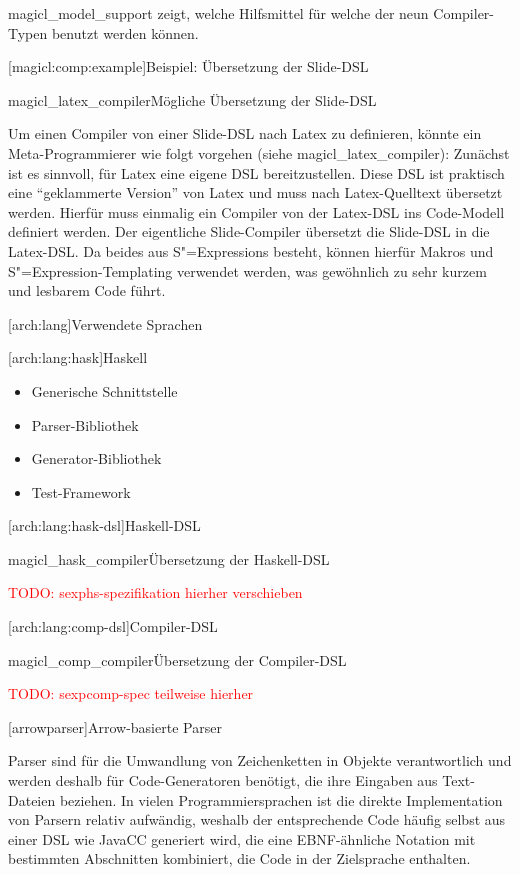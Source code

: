 \documentclass[12pt, a4paper, bibgerm]{scrbook}
\newcommand{\todo}[1]{
  \textcolor{red}{TODO: #1}
}
\newcommand\lchapter{}
\newcommand\lsection{}
\newcommand\lsubsection{}
\newcommand\lsubsubsection{}
\newcommand\abb{}
\newcommand\fig{}
\newcommand{\sexp}{S"=Expression}
\newcommand{\sexps}{S"=Expressions}
\begin{document}
\abb{magicl_model_support} zeigt, welche Hilfsmittel für
welche der neun Compiler-Typen benutzt werden können.

\lsubsubsection[magicl:comp:example]{Beispiel: Übersetzung der Slide-DSL}

\fig{magicl_latex_compiler}{Mögliche Übersetzung der Slide-DSL}

Um einen Compiler von einer Slide-DSL nach Latex zu definieren, könnte
ein Meta-Programmierer wie folgt vorgehen (siehe
\abb{magicl_latex_compiler}): Zunächst ist es sinnvoll, für Latex eine
eigene DSL bereitzustellen. Diese DSL ist praktisch eine ``geklammerte
Version'' von Latex und muss nach Latex-Quelltext übersetzt
werden. Hierfür muss einmalig ein Compiler von der Latex-DSL ins
Code-Modell definiert werden. Der eigentliche Slide-Compiler übersetzt
die Slide-DSL in die Latex-DSL. Da beides aus \sexps{} besteht, können
hierfür Makros und \sexp{}-Templating verwendet werden, was gewöhnlich
zu sehr kurzem und lesbarem Code führt.

\lsection[arch:lang]{Verwendete Sprachen}

\lsubsection[arch:lang:hask]{Haskell}

\begin{itemize}
\item Generische Schnittstelle
\item Parser-Bibliothek
\item Generator-Bibliothek
\item Test-Framework
\end{itemize}


\lsubsection[arch:lang:hask-dsl]{Haskell-DSL}

\fig{magicl_hask_compiler}{Übersetzung der Haskell-DSL}
\todo{sexphs-spezifikation hierher verschieben}

\lsubsection[arch:lang:comp-dsl]{Compiler-DSL}

\fig{magicl_comp_compiler}{Übersetzung der Compiler-DSL}

\todo{sexpcomp-spec teilweise hierher}


\lchapter[arrowparser]{Arrow-basierte Parser}

Parser sind für die Umwandlung von Zeichenketten in Objekte
verantwortlich und werden deshalb für Code-Generatoren benötigt, die
ihre Eingaben aus Text-Dateien beziehen. In vielen Programmiersprachen
ist die direkte Implementation von Parsern relativ aufwändig, weshalb
der entsprechende Code häufig selbst aus einer DSL wie JavaCC
generiert wird, die eine EBNF-ähnliche Notation mit bestimmten
Abschnitten kombiniert, die Code in der Zielsprache enthalten.
\end{document}
